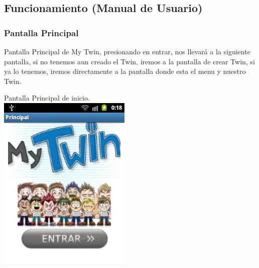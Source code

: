 \documentclass[10pt]{article}
\begin{document}
{\begin{flushleft}
\end{flushleft}

\newpage
\begin{flushleft}
\subsection{Funcionamiento (Manual de Usuario)}
\subsubsection{Pantalla Principal}

Pantalla Principal de My Twin, presionando en entrar, nos llevar\'a a la siguiente pantalla, si no tenemos aun creado el Twin, iremos a la pantalla de crear Twin, si ya lo tenemos, iremos directamente a la pantalla donde esta el menu y nuestro Twin.

\begin{center}
\vspace{0.1in}Pantalla Principal de inicio.\\
\vspace{0.1in}\includegraphics[scale=0.7]{PPrincipal}\\
\end{center}


\end{flushleft}}
\end{document}
